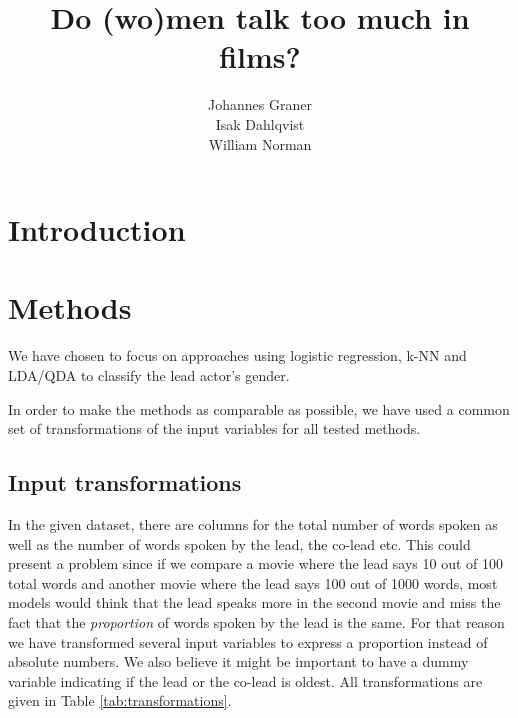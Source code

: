 \documentclass{article}
\title{Do (wo)men talk too much in films?}
\author{%
  Johannes Graner \\
  \And
  Isak Dahlqvist \\
  \AND
  William Norman \\
}
\begin{document}
\maketitle

\begin{abstract}
  
\end{abstract}

\newpage

\section{Introduction}

\section{Methods}
We have chosen to focus on approaches using logistic regression, k-NN and LDA/QDA to classify the lead actor's gender.

In order to make the methods as comparable as possible, we have used a common set of transformations of the input variables for all tested methods.

\subsection{Input transformations}
In the given dataset, there are columns for the total number of words spoken as well as the number of words spoken by the lead, the co-lead etc. This could present a problem since if we compare a movie where the lead says 10 out of 100 total words and another movie where the lead says 100 out of 1000 words, most models would think that the lead speaks more in the second movie and miss the fact that the \textit{proportion} of words spoken by the lead is the same. For that reason we have transformed several input variables to express a proportion instead of absolute numbers. We also believe it might be important to have a dummy variable indicating if the lead or the co-lead is oldest. All transformations are given in Table \ref{tab:transformations}.
\end{document}
